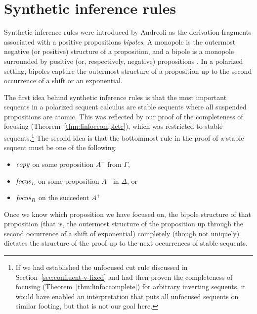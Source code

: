 \section{Synthetic inference rules}
\label{sec:linsynthetic}

Synthetic inference rules were introduced by Andreoli as the
derivation fragments associated with a positive propositions {\it
  bipoles}. A monopole is the outermost negative (or positive)
structure of a proposition, and a bipole is a monopole surrounded by
positive (or, respectively, negative) propositions
\cite{andreoli01focussing}. In a polarized setting, bipoles capture
the outermost structure of a proposition up to the second occurrence
of a shift or an exponential.

The first idea behind synthetic inference rules is that the most
important sequents in a polarized sequent calculus are stable sequents
where all suspended propositions are atomic.  This was reflected by
our proof of the completeness of focusing
(Theorem~\ref{thm:linfoccomplete}), which was restricted to stable
sequents.\footnote{If we had established the unfocused cut rule
  discussed in Section~\ref{sec:confluent-v-fixed} and had then proven
  the completeness of focusing (Theorem~\ref{thm:linfoccomplete}) for
  arbitrary inverting sequents, it would have enabled an
  interpretation that puts all unfocused sequents on similar footing,
  but that is not our goal here.}
The second idea is that the bottommost rule in the proof of 
a stable sequent must be one of the following:
\smallskip
\begin{itemize}
\item ${\it copy}$ on some proposition $A^-$ from $\Gamma$, 
\item ${\it focus}_L$ on some proposition $A^-$ in $\Delta$, or
\item ${\it focus}_R$ on the succedent $A^+$
\end{itemize}
\smallskip
%
Once we know which proposition we have focused on, the bipole
structure of that proposition (that is, the outermost structure of the
proposition up through the second occurrence of a shift of exponential)
completely (though not uniquely) dictates the structure of the proof
up to the next occurrences of stable sequents.

